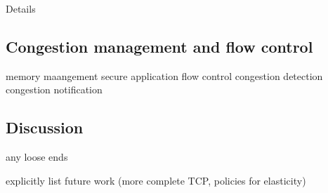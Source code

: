 \todo Details 


\subsection{Congestion management and flow control}

\todo memory maangement
\todo secure application flow control
\todo congestion detection
\todo congestion notification

\subsection{Discussion}

\todo any loose ends

\todo explicitly list future work (more complete TCP, policies for elasticity)


